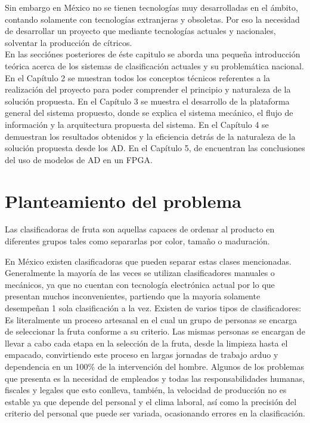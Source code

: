 \documentclass[twoside,spanish,ESP,MSc]{plantillaLabUPV}
\theoremstyle{definition}
\begin{document}
Sin embargo en México no se tienen tecnologías muy desarrolladas en el ámbito, contando solamente con tecnologías extranjeras y obsoletas. Por eso la necesidad de desarrollar un proyecto que mediante tecnologías actuales y nacionales, solventar la producción de cítricos.\\


En las secciónes posteriores de éste capitulo se aborda una pequeña introducción teórica acerca de los sistemas de clasificación actuales y su problemática nacional. En el Capítulo 2 se muestran todos los conceptos técnicos referentes a la realización del proyecto para poder comprender el principio y naturaleza de la solución propuesta. En el Capítulo 3 se muestra el desarrollo de la plataforma general del sistema propuesto, donde se explica el sistema mecánico, el flujo de información y la arquitectura propuesta del sistema. En el Capítulo 4 se demuestran los resultados obtenidos y la eficiencia detrás de la naturaleza de la solución propuesta desde los AD. En el Capítulo 5, de encuentran las conclusiones del uso de modelos de AD en un FPGA.




\section{Planteamiento del problema}
Las clasificadoras de fruta son aquellas capaces de ordenar al producto en diferentes grupos tales como separarlas por color, tamaño o maduración.

En México existen clasificadoras que pueden separar estas clases mencionadas. Generalmente la mayoría de las veces se utilizan clasificadores manuales o mecánicos, ya que no cuentan con tecnología electrónica actual por lo que presentan muchos inconvenientes, partiendo que la mayoria solamente desempeñan 1 sola clasificación a la vez. Existen de varios tipos de clasificadores:\\


 Es literalmente un proceso artesanal %
 en el cual un grupo de personas  se encarga de seleccionar la fruta conforme a su criterio. Las mismas personas se encargan de llevar a cabo cada etapa en la selección de la fruta, desde la limpieza hasta el empacado, convirtiendo este proceso en largas jornadas de trabajo arduo y dependencia en un 100\% de la intervención del hombre. Algunos de los problemas que presenta es la necesidad de empleados y todas las responsabilidades humanas, fiscales y legales que esto conlleva, también, la velocidad de producción no es estable ya que depende del personal y el clima laboral, así como la precisión del criterio del personal que puede ser variada, ocasionando errores en la clasificación.\\
\end{document}
